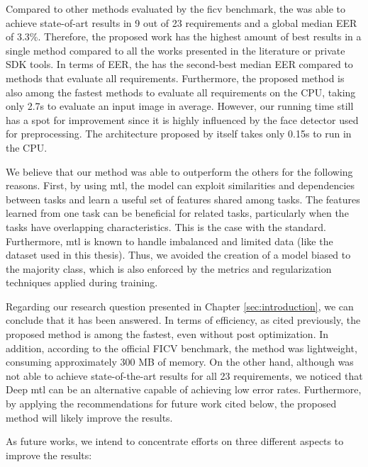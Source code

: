 Compared to other methods evaluated by the \acs{ficv} benchmark, the \methodname was able to achieve state-of-art results in 9 out of 23 requirements and a global median EER of 3.3\%. Therefore, the proposed work has the highest amount of best results in a single method compared to all the works presented in the literature or private SDK tools. In terms of EER, the \methodname has the second-best median EER compared to methods that evaluate all requirements. Furthermore, the proposed method is also among the fastest methods to evaluate all requirements on the CPU, taking only 2.7s to evaluate an input image in average. However, our running time still has a spot for improvement since it is highly influenced by the face detector used for preprocessing. The architecture proposed by itself takes only 0.15s to run in the CPU.

We believe that our method was able to outperform the others for the following reasons. First, by using \acs{mtl}, the model can exploit similarities and dependencies between tasks and learn a useful set of features shared among tasks. The features learned from one task can be beneficial for related tasks, particularly when the tasks have overlapping characteristics. This is the case with the \icao standard. Furthermore, \acs{mtl} is known to handle imbalanced and limited data (like the dataset used in this thesis). Thus, we avoided the creation of a model biased to the majority class, which is also enforced by the metrics and regularization techniques applied during training.

Regarding our research question presented in Chapter \ref{sec:introduction}, we can conclude that it has been answered. In terms of efficiency, as cited previously, the proposed method is among the fastest, even without post optimization. In addition, according to the official FICV benchmark, the method was lightweight, consuming approximately 300 MB of memory. On the other hand, although \methodname was not able to achieve state-of-the-art results for all 23 requirements, we noticed that Deep \acl{mtl} can be an alternative capable of achieving low error rates. Furthermore, by applying the recommendations for future work cited below, the proposed method will likely improve the results.

As future works, we intend to concentrate efforts on three different aspects to improve the results:

